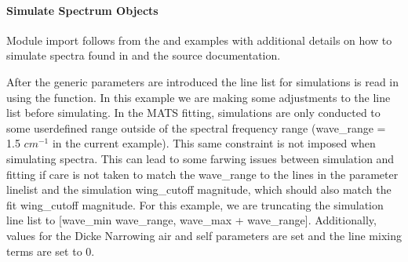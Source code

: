 \documentclass[letterpaper,10pt,english]{sphinxmanual}
\begin{document}
\paragraph{Simulate Spectrum Objects}
\label{\detokenize{Applying Analytical Correction to hardness of collisions for HTP:simulate-spectrum-objects}}
\sphinxAtStartPar
Module import follows from the {\hyperref[\detokenize{Fitting Experimental Spectra:fitting-experimental-spectra}]{}} and {\hyperref[\detokenize{Fitting Synthetic Spectra:fitting-synthetic-spectra}]{}} examples with additional details on how to simulate spectra found in {\hyperref[\detokenize{Fitting Synthetic Spectra:fitting-synthetic-spectra}]{}} and the source documentation.

\sphinxAtStartPar
After the generic parameters are introduced the line list for simulations is read in using the {\hyperref[\detokenize{MATS:MATS.linelistdata.LoadLineListData}]{}} function.  In this example we are making some adjustments to the line list before simulating.  In the MATS fitting, simulations are only conducted to some user\sphinxhyphen{}defined range outside of the spectral frequency range (wave\_range = 1.5 \(cm^{-1}\) in the current example).  This same constraint is not imposed when simulating spectra.  This can lead to some far\sphinxhyphen{}wing issues between simulation and fitting if care is not taken to match the wave\_range to the lines in the parameter linelist and the simulation wing\_cutoff magnitude, which should also match the fit wing\_cutoff magnitude. For this example, we are truncating the simulation line list to {[}wave\_min \sphinxhyphen{} wave\_range, wave\_max + wave\_range{]}.  Additionally, values for the Dicke Narrowing air and self parameters are set and the line mixing terms are set to 0.
\end{document}
